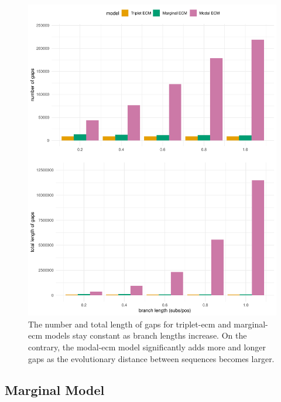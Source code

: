 \begin{figure}[!ht]
\centering
\includegraphics[width = 0.75\linewidth]{chapter3/figures/results/results_marginal_triplet_ecm_gaps.pdf}
 \vspace{1mm}
 \caption[ECM Dataset Indel Statistics]{The number and total length of gaps for triplet-ecm and marginal-ecm models stay constant as branch lengths increase. On the contrary, the modal-ecm model significantly adds more and longer gaps as the evolutionary distance between sequences becomes larger.}
 \label{fig:results_tri_mar_ecm_gaps}
\end{figure}

\clearpage

\subsection{Marginal Model}

